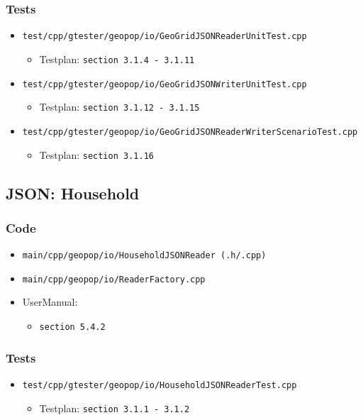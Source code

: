 \documentclass[runningheads]{llncs}
\begin{document}
	\subsubsection{Tests}
	\begin{itemize}
		\item \texttt{test/cpp/gtester/geopop/io/GeoGridJSONReaderUnitTest.cpp}
			\begin{itemize}
				\item Testplan: \texttt{section 3.1.4 - 3.1.11}
			\end{itemize}
		\item \texttt{test/cpp/gtester/geopop/io/GeoGridJSONWriterUnitTest.cpp}
			\begin{itemize}
				\item Testplan: \texttt{section 3.1.12 - 3.1.15}
			\end{itemize}
		\item \texttt{test/cpp/gtester/geopop/io/GeoGridJSONReaderWriterScenarioTest.cpp}
			\begin{itemize}
				\item Testplan: \texttt{section 3.1.16}
			\end{itemize}
	\end{itemize}

	\subsection{JSON: Household}
	\subsubsection{Code}
	\begin{itemize}
		\item \texttt{main/cpp/geopop/io/HouseholdJSONReader (.h/.cpp)}
		\item \texttt{main/cpp/geopop/io/ReaderFactory.cpp}
		\item UserManual:
		\begin{itemize}
			\item \texttt{section 5.4.2}
		\end{itemize}
	\end{itemize}

	\subsubsection{Tests}
	\begin{itemize}
		\item \texttt{test/cpp/gtester/geopop/io/HouseholdJSONReaderTest.cpp}
		\begin{itemize}
			\item Testplan: \texttt{section 3.1.1 - 3.1.2}
		\end{itemize}
	\end{itemize}
	
\end{document}
